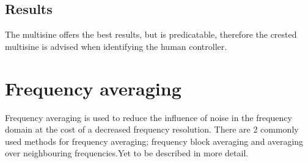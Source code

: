 \subsection{Results}
The multisine offers the best results, but is predicatable, therefore the crested multisine is advised when identifying  the human controller.
\section{Frequency averaging}
Frequency averaging is used to reduce the influence of noise in the frequency domain at the cost of a decreased frequency resolution. There are 2 commonly used methods for frequency averaging; frequency block averaging and averaging over neighbouring frequencies.Yet to be described in more detail. 




